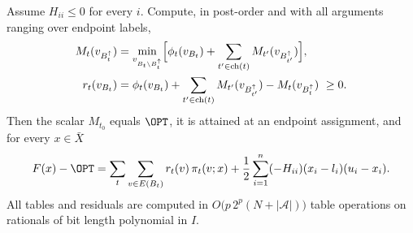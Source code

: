 \begin{lemma}\label{lem:endpointid}
Assume $H_{ii}\le0$ for every $i$. Compute, in post-order and with all
arguments ranging over endpoint labels,
\begin{align*}
M_t(v_{B_t^\uparrow})&=\min_{v_{B_t\setminus B_t^\uparrow}}
\Bigl[\phi_t(v_{B_t})+\sum_{t'\in\mathrm{ch}(t)}M_{t'}(v_{B_{t'}^\uparrow})\Bigr],\\
r_t(v_{B_t})&=\phi_t(v_{B_t})+\sum_{t'\in\mathrm{ch}(t)}M_{t'}(v_{B_{t'}^\uparrow})
-M_t(v_{B_t^\uparrow})\ \ge0 .
\end{align*}
Then the scalar $M_{t_0}$ equals $\OPT$, it is attained at an endpoint
assignment, and for every $x\in\bar X$
\begin{equation}\label{eq:endpointid}
F(x)-\OPT=\sum_{t}\sum_{v\in E(B_t)}r_t(v)\,\pi_t(v;x)
+\frac12\sum_{i=1}^n(-H_{ii})(x_i-l_i)(u_i-x_i).
\end{equation}
All tables and residuals are computed in
$O\bigl(p\,2^p(N+|\mathcal A|)\bigr)$ table operations on rationals of
bit length polynomial in $I$.
\end{lemma}

